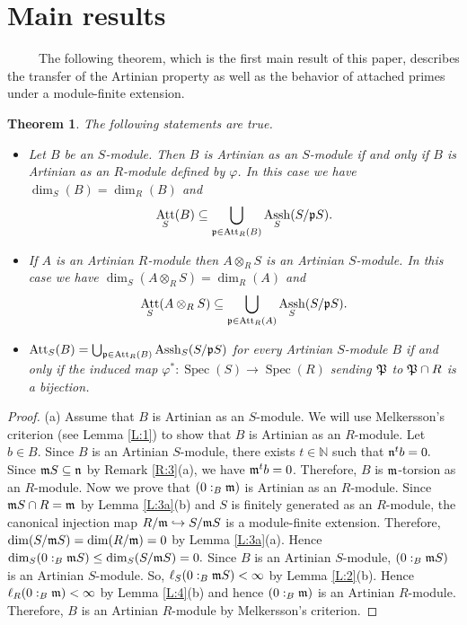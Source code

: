 \documentclass[a4papersize]{article}
\newtheorem{theorem}{Theorem}[section]
\DeclareMathOperator{\Assh}{Assh}
\DeclareMathOperator{\Att}{Att}
\DeclareMathOperator{\Spec}{Spec}
\begin{document}
{\section{Main results}	
	
\ \ \ \ \ The following theorem, which is the first main result of this paper, describes the transfer of the Artinian property as well as the behavior of attached primes under a module-finite extension. 

\begin{theorem}\label{T:1} The following statements are true. 
\begin{itemize}
\item [{\rm (a)}]  Let	 $B$  be  an $S$-module. Then $B$ is Artinian as an $S$-module if and only if $B$ is   Artinian as an $R$-module defined by $\varphi$. In this case we have $\dim_{S}(B)=\dim_R(B)$ and	$$\Att_S(B)\subseteq\bigcup_{\frak p\in\Att_R(B)}\Assh_S(S/\frak pS).$$	
								
\item [{\rm (b)}] If $A$ is an Artinian $R$-module then $A\otimes_RS$ is an Artinian $S$-module. In this case we have $\dim_S(A\otimes_RS)=\dim_R(A)$ and  					
$$\Att_S(A\otimes_RS)\subseteq\bigcup_{\frak p\in\Att_R(A)}\Assh_S(S/\frak pS).$$			
		
\item [{\rm (c) }] $\Att_S(B)=\bigcup_{\frak p\in\Att_R(B)}\Assh_S(S/\frak pS)$ for every Artinian $S$-module $B$ if and only if the induced map $\varphi^*:\Spec(S)\to\Spec(R)$ sending $\frak P$ to $\frak P\cap R$ is a bijection.				
\end{itemize}
\end{theorem}
		
\begin{proof} (a)  Assume that $B$ is Artinian as an $S$-module. We will use Melkersson's criterion (see Lemma \ref{L:1}) to show that $B$ is Artinian as an $R$-module. Let $b\in B.$ Since $B$ is an Artinian $S$-module, there exists $t\in\mathbb{N}$ such that $\frak n^tb=0.$  Since $\frak mS\subseteq \frak n$ by Remark \ref{R:3}(a), we have  $\frak m^tb=0$. Therefore, $B$ is $\frak m$-torsion as an $R$-module.  Now we prove that $(0:_B\frak m)$ is Artinian as an  $R$-module. Since $\frak mS\cap R=\frak m$ by Lemma \ref{L:3a}(b) and $S$ is finitely generated as an $R$-module, the  canonical injection map $R/\frak m\hookrightarrow S/\frak mS$ is a module-finite extension. Therefore, $\dim(S/\frak mS)=\dim(R/\frak m)=0$  by Lemma \ref{L:3a}(a). Hence $\dim _S(0:_B\frak mS)\leq\dim_S(S/\frak mS)=0.$ Since  $B$ is an Artinian $S$-module, $(0:_B\frak mS)$ is an Artinian  $S$-module. So, $\ell_S(0:_B\frak mS)<\infty$ by Lemma \ref{L:2}(b). Hence  $\ell_R(0:_B\frak m)<\infty$ by Lemma \ref{L:4}(b) and hence  $(0:_B\frak m)$ is an Artinian $R$-module. Therefore, $B$ is an Artinian $R$-module by Melkersson's criterion.	
		

\end{proof}}
\end{document}
